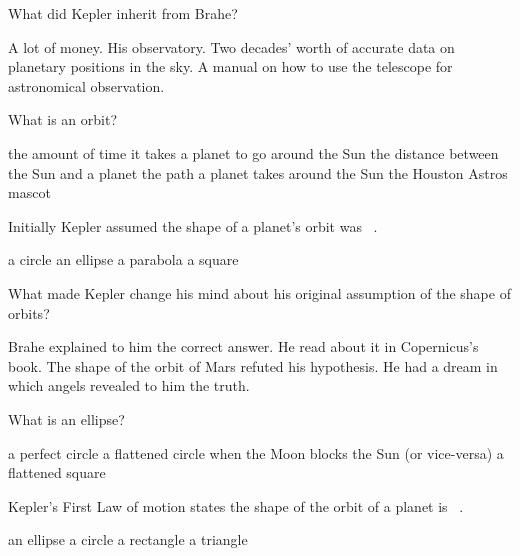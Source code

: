 \documentclass[addpoints]{exam}
\begin{document}
\begin{questions}
\question
What did Kepler inherit from Brahe?

\begin{choices}
    \choice A lot of money.
    \choice His observatory.
    \correctchoice Two decades' worth of accurate data on planetary positions in the sky. 
    \choice A manual on how to use the telescope for astronomical observation.
\end{choices}

\question
What is an orbit?

\begin{choices}
    \choice the amount of time it takes a planet to go around the Sun
    \choice the distance between the Sun and a planet
    \correctchoice the path a planet takes around the Sun
    \choice the Houston Astros mascot
\end{choices}

\question
Initially Kepler assumed the shape of a planet's orbit was \fillin\ .

\begin{choices}
    \correctchoice a circle
    \choice an ellipse
    \choice a parabola
    \choice a square
\end{choices}

\question
What made Kepler change his mind about his original assumption of the shape of orbits?

\begin{choices}
    \choice Brahe explained to him the correct answer. 
    \choice He read about it in Copernicus's book.
    \correctchoice The shape of the orbit of Mars refuted his hypothesis.
    \choice He had a dream in which angels revealed to him the truth.
\end{choices}

\question
What is an ellipse?

\begin{choices}
    \choice a perfect circle
    \correctchoice a flattened circle
    \choice when the Moon blocks the Sun (or vice-versa)
    \choice a flattened square
\end{choices}

\question
Kepler's First Law of motion states the shape of the orbit of a planet is \fillin\ .

\begin{choices}
    \correctchoice an ellipse 
    \choice a circle
    \choice a rectangle
    \choice a triangle
\end{choices}




\end{questions}
\end{document}

